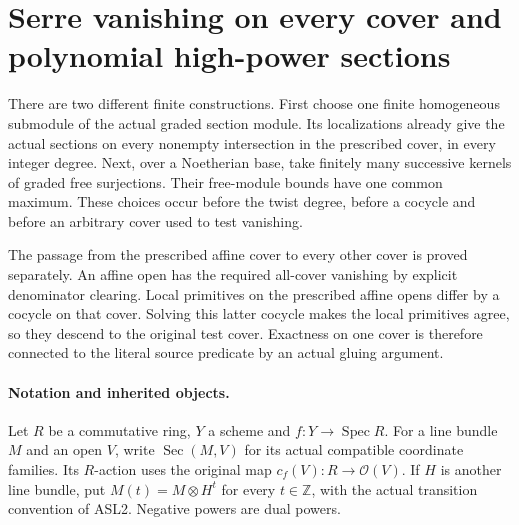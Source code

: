 \section{Serre vanishing on every cover and polynomial high-power sections}
\label{sec:serre-h1-v055}


There are two different finite constructions.  First choose one finite
homogeneous submodule of the actual graded section module.  Its
localizations already give the actual sections on every nonempty
intersection in the prescribed cover, in every integer degree.  Next,
over a Noetherian base, take finitely many successive kernels of graded
free surjections.  Their free-module bounds have one common maximum.
These choices occur before the twist degree, before a cocycle and before
an arbitrary cover used to test vanishing.

The passage from the prescribed affine cover to every other cover is
proved separately.  An affine open has the required all-cover vanishing
by explicit denominator clearing.  Local primitives on the prescribed
affine opens differ by a cocycle on that cover.  Solving this latter
cocycle makes the local primitives agree, so they descend to the original
test cover.  Exactness on one cover is therefore connected to the literal
source predicate by an actual gluing argument.

\paragraph{Notation and inherited objects.}
Let $R$ be a commutative ring, $Y$ a scheme and
$f:Y\to\operatorname{Spec}R$.  For a line bundle $M$ and an open $V$,
write $\operatorname{Sec}(M,V)$ for its actual compatible coordinate
families.  Its $R$-action uses the original map
$c_f(V):R\to\mathcal O(V)$.  If $H$ is another line bundle, put
$M(t)=M\otimes H^t$ for every $t\in\mathbb Z$, with the actual
transition convention of ASL2.  Negative powers are dual powers.

